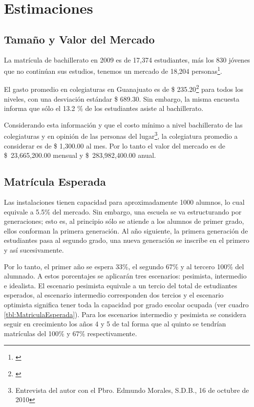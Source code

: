 \clearpage

\section{Estimaciones}
\label{sec:Neg:Estimaciones}

\subsection{Tamaño y Valor del Mercado}

La matrícula de bachillerato en 2009 es de 17,374 estudiantes, más los 830 jóvenes que no continúan sus estudios, tenemos un mercado de 18,204 personas\footnote{\citep{Seg2010}}.

El gasto promedio en colegiaturas en Guanajuato es de \$ 235.20\footnote{\citep{INEGI-2009-DGES-003}} para todos los niveles, con una desviación estándar \$ 689.30. Sin embargo, la misma encuesta informa que sólo el 13.2 \% de los estudiantes asiste al bachillerato.

Considerando esta información y que el costo mínimo a nivel bachillerato de las colegiaturas y en opinión de las personas del lugar\footnote{Entrevista del autor con el Pbro. Edmundo Morales, S.D.B., 16 de octubre de 2010}, la colegiatura promedio a considerar es de \$ 1,300.00 al mes. Por lo tanto el valor del mercado es de \$~23,665,200.00 mensual y \$~283,982,400.00 anual.

\subsection{Matrícula Esperada}

Las instalaciones tienen capacidad para aproximadamente 1000 alumnos, lo cual equivale a 5.5\% del mercado. Sin embargo, una escuela se va estructurando por generaciones; esto es, al principio sólo se atiende a los alumnos de primer grado, ellos conforman la primera generación. Al año siguiente, la primera generación de estudiantes pasa al segundo grado, una nueva generación se inscribe en el primero y así sucesivamente.

Por lo tanto, el primer año se espera 33\%, el segundo 67\% y al tercero 100\% del alumnado. A estos porcentajes se aplicarán tres escenarios: pesimista, intermedio e idealista. El escenario pesimista equivale a un tercio del total de estudiantes esperados, al escenario intermedio corresponden dos tercios y el escenario optimista significa tener toda la capacidad por grado escolar ocupada (ver cuadro \ref{tbl:MatriculaEsperada}). Para los escenarios intermedio y pesimista se considera seguir en crecimiento los años 4 y 5 de tal forma que al quinto se tendrían matrículas del 100\% y 67\% respectivamente.







\clearpage
